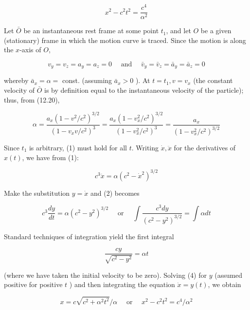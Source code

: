 \documentclass[10pt]{article}
\begin{document}
$$
x^{2}-c^{2} t^{2}=\frac{c^{4}}{\alpha^{2}}
$$

Let $\bar{O}$ be an instantaneous rest frame at some point $t_{1}$, and let $O$ be a given (stationary) frame in which the motion curve is traced. Since the motion is along the $x$-axis of $O$,

$$
v_{y}=v_{z}=a_{y}=a_{z}=0 \quad \text { and } \quad \bar{v}_{y}=\bar{v}_{z}=\bar{a}_{y}=\bar{a}_{z}=0
$$

whereby $\bar{a}_{x}=\alpha=$ const. (assuming $\bar{a}_{x}>0$ ). At $t=t_{1}, v=v_{x}$ (the constant velocity of $\bar{O}$ is by definition equal to the instantaneous velocity of the particle); thus, from (12.20),


\begin{equation*}
\alpha=\frac{a_{x}\left(1-v^{2} / c^{2}\right)^{3 / 2}}{\left(1-v_{x} v / c^{2}\right)^{3}}=\frac{a_{x}\left(1-v_{x}^{2} / c^{2}\right)^{3 / 2}}{\left(1-v_{x}^{2} / c^{2}\right)^{3}}=\frac{a_{x}}{\left(1-v_{x}^{2} / c^{2}\right)^{3 / 2}} \tag{1}
\end{equation*}


Since $t_{1}$ is arbitrary, (1) must hold for all $t$. Writing $\dot{x}, \ddot{x}$ for the derivatives of $x(t)$, we have from (1):


\begin{equation*}
c^{3} \ddot{x}=\alpha\left(c^{2}-\dot{x}^{2}\right)^{3 / 2} \tag{2}
\end{equation*}


Make the substitution $y=\dot{x}$ and (2) becomes


\begin{equation*}
c^{3} \frac{d y}{d t}=\alpha\left(c^{2}-y^{2}\right)^{3 / 2} \quad \text { or } \quad \int \frac{c^{3} d y}{\left(c^{2}-y^{2}\right)^{3 / 2}}=\int \alpha d t \tag{3}
\end{equation*}


Standard techniques of integration yield the first integral


\begin{equation*}
\frac{c y}{\sqrt{c^{2}-y^{2}}}=\alpha t \tag{4}
\end{equation*}


(where we have taken the initial velocity to be zero). Solving (4) for $y$ (assumed positive for positive $t$ ) and then integrating the equation $\dot{x}=y(t)$, we obtain

$$
x=c \sqrt{c^{2}+\alpha^{2} t^{2}} / \alpha \quad \text { or } \quad x^{2}-c^{2} t^{2}=c^{4} / \alpha^{2}
$$
\end{document}
